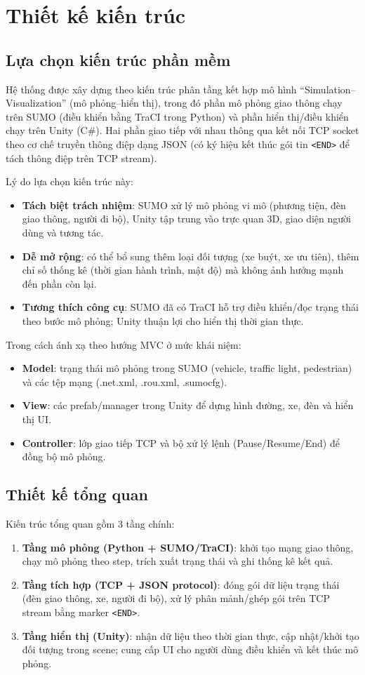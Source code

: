 \documentclass[../DoAn.tex]{subfiles}
\begin{document}
\section{Thiết kế kiến trúc}
\subsection{Lựa chọn kiến trúc phần mềm}
Hệ thống được xây dựng theo kiến trúc phân tầng kết hợp mô hình ``Simulation--Visualization'' (mô phỏng--hiển thị), trong đó phần mô phỏng giao thông chạy trên SUMO (điều khiển bằng TraCI trong Python) và phần hiển thị/điều khiển chạy trên Unity (C\#). Hai phần giao tiếp với nhau thông qua kết nối TCP socket theo cơ chế truyền thông điệp dạng JSON (có ký hiệu kết thúc gói tin \texttt{<END>} để tách thông điệp trên TCP stream).

Lý do lựa chọn kiến trúc này:
\begin{itemize}
	\item \textbf{Tách biệt trách nhiệm}: SUMO xử lý mô phỏng vi mô (phương tiện, đèn giao thông, người đi bộ), Unity tập trung vào trực quan 3D, giao diện người dùng và tương tác.
	\item \textbf{Dễ mở rộng}: có thể bổ sung thêm loại đối tượng (xe buýt, xe ưu tiên), thêm chỉ số thống kê (thời gian hành trình, mật độ) mà không ảnh hưởng mạnh đến phần còn lại.
	\item \textbf{Tương thích công cụ}: SUMO đã có TraCI hỗ trợ điều khiển/đọc trạng thái theo bước mô phỏng; Unity thuận lợi cho hiển thị thời gian thực.
\end{itemize}

Trong cách ánh xạ theo hướng MVC ở mức khái niệm:
\begin{itemize}
	\item \textbf{Model}: trạng thái mô phỏng trong SUMO (vehicle, traffic light, pedestrian) và các tệp mạng (.net.xml, .rou.xml, .sumocfg).
	\item \textbf{View}: các prefab/manager trong Unity để dựng hình đường, xe, đèn và hiển thị UI.
	\item \textbf{Controller}: lớp giao tiếp TCP và bộ xử lý lệnh (Pause/Resume/End) để đồng bộ mô phỏng.
\end{itemize}

\subsection{Thiết kế tổng quan}
Kiến trúc tổng quan gồm 3 tầng chính:
\begin{enumerate}
	\item \textbf{Tầng mô phỏng (Python + SUMO/TraCI)}: khởi tạo mạng giao thông, chạy mô phỏng theo step, trích xuất trạng thái và ghi thống kê kết quả.
	\item \textbf{Tầng tích hợp (TCP + JSON protocol)}: đóng gói dữ liệu trạng thái (đèn giao thông, xe, người đi bộ), xử lý phân mảnh/ghép gói trên TCP stream bằng marker \texttt{<END>}.
	\item \textbf{Tầng hiển thị (Unity)}: nhận dữ liệu theo thời gian thực, cập nhật/khởi tạo đối tượng trong scene; cung cấp UI cho người dùng điều khiển và kết thúc mô phỏng.
\end{enumerate}
\end{document}
